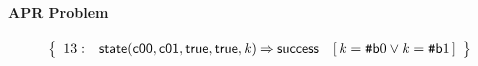 \documentclass[a4paper]{article}
\newcommand{\ttsym}[1]{\mbox{\tt #1}}
\def\ttsharp{\ttsym{\symbol{35}}}
\newcommand{\symb}[1]{\mathsf{#1}}
\newcommand{\var}[1]{\mathit{#1}}
\newcommand{\Constraint}[1]{[\, #1 \,]}
\newcommand{\bv}[2][b]{{\ttsharp\symb{#1}{#2}}}
\begin{document}
\paragraph{APR Problem}

\[
\left\{
\begin{array}{rr@{\>}c@{\>}ll}
\mathrm{13} : 
 & \symb{state}(\symb{c00},\symb{c01},\symb{true},\symb{true},\var{k})
 & \Rightarrow 
 & \symb{success}
 & \Constraint{\var{k} = \bv{0} \lor \var{k} = \bv{1}} \\

\end{array}
\right\}
\]
\end{document}
